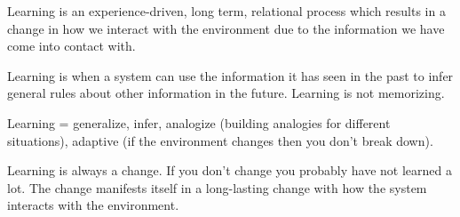 \documentclass[
  11pt,
  british,
]{article}
\begin{document}
Learning is an experience-driven, long term, relational process which
results in a change in how we interact with the environment due to the
information we have come into contact with.

Learning is when a system can use the information it has seen in the
past to infer general rules about other information in the future.
Learning is not memorizing.

Learning = generalize, infer, analogize (building analogies for
different situations), adaptive (if the environment changes then you
don't break down).

Learning is always a change. If you don't change you probably have not
learned a lot. The change manifests itself in a long-lasting change with
how the system interacts with the environment.
\end{document}
